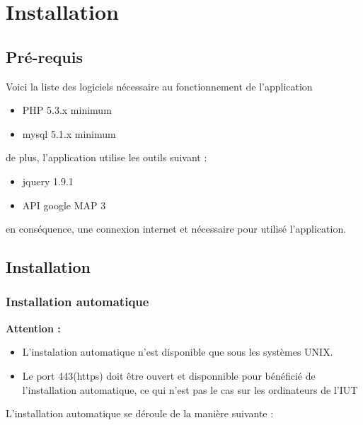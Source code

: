\documentclass[a4paper,10pt]{report}
\begin{document}
\chapter{Installation}

\section{Pr\'e-requis}
Voici la liste des logiciels n\'ecessaire au fonctionnement de l'application

\begin{itemize}
    \item PHP 5.3.x minimum
    \item mysql 5.1.x minimum
\end{itemize}

\null

de plus, l'application utilise les outils suivant :

\begin{itemize}
    \item jquery 1.9.1
    \item API google MAP 3
\end{itemize}

\null

en cons\'equence, une connexion internet et n\'ecessaire pour utilis\'e
l'application.


\section{Installation}

\subsection{Installation automatique}

\textbf{Attention :} 
\begin{itemize}
    \item L'instalation automatique n'est disponible que sous les syst\`emes UNIX.
    \item Le port 443(https) doit \^etre ouvert et disponnible pour b\'en\'efici\'e
    de l'installation automatique, ce qui n'est pas le cas sur les ordinateurs de l'IUT
\end{itemize}

\null

L'installation automatique se d\'eroule de la mani\`ere suivante :
\end{document}
